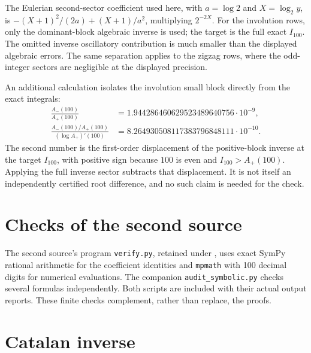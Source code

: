 \documentclass[11pt,openany]{book}
\numberwithin{equation}{chapter}
\theoremstyle{plain}
\theoremstyle{definition}
\theoremstyle{remark}
\begin{document}
The Eulerian second-sector coefficient used here, with $a=\log2$ and $X=\log_2 y$, is
$-(X+1)^2/(2a)+(X+1)/a^2$, multiplying $2^{-2X}$.
For the involution rows, only the dominant-block algebraic inverse is used; the target is the full exact $I_{100}$. The omitted inverse oscillatory contribution is much smaller than the displayed algebraic errors. The same separation applies to the zigzag rows, where the odd-integer sectors are negligible at the displayed precision.

An additional calculation isolates the involution small block directly from the exact integrals:
\begin{align}
 \frac{A_-(100)}{A_+(100)}
 &=1.944286460629523489640756\cdot10^{-9},\nonumber\\
 \frac{A_-(100)/A_+(100)}{(\log A_+)'(100)}
 &=8.264930508117383796848111\cdot10^{-10}.
 \label{t1:eq:ivsmallnumeric}
\end{align}
The second number is the first-order displacement of the positive-block inverse at the target $I_{100}$, with positive sign because $100$ is even and $I_{100}>A_+(100)$. Applying the full inverse sector subtracts that displacement. It is not itself an independently certified root difference, and no such claim is needed for the check.

\section{Checks of the second source}
\label{ct:sec:numerics-t2}

\label{t2:app:verification}

The second source's program \texttt{verify.py}, retained under , uses exact SymPy rational arithmetic for the coefficient identities and \texttt{mpmath} with 100 decimal digits for numerical evaluations. The companion \texttt{audit\_symbolic.py} checks several formulas independently. Both scripts are included with their actual output reports. These finite checks complement, rather than replace, the proofs.

\section{Catalan inverse}
\end{document}
